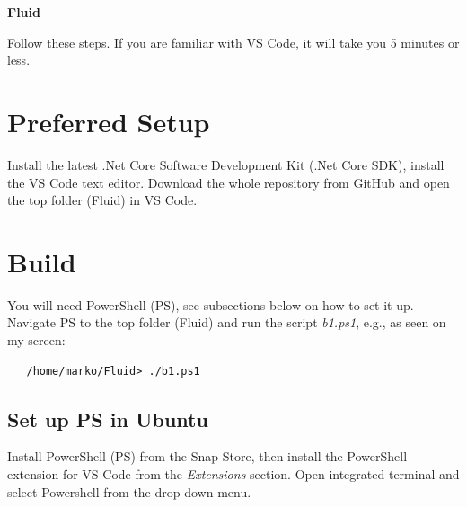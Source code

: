 

\cfoot{\thepage}								      %
\renewcommand{\headrulewidth}{0.0cm}			%
\renewcommand{\footrulewidth}{0.0cm}			%
\lstset{language=bash,basicstyle=\small\sffamily}



\begin{center}
   \textbf{\LARGE{Fluid}}\\[0.5cm]
\end{center}

Follow these steps. If you are familiar with VS Code, it will take you 5 minutes or less.

\section{Preferred Setup}
Install the latest .Net Core Software Development Kit (.Net Core SDK), install the VS Code text editor. Download the whole repository from GitHub and open the top folder (Fluid) in VS Code.

\section{Build}
You will need PowerShell (PS), see subsections below on how to set it up. Navigate PS to the top folder (Fluid) and run the script \emph{b1.ps1}, e.g., as seen on my screen:

\begin{lstlisting}
   /home/marko/Fluid> ./b1.ps1
\end{lstlisting}

\subsection{Set up PS in Ubuntu}
Install PowerShell (PS) from the Snap Store, then install the PowerShell extension for VS Code from the \emph{Extensions} section. Open integrated terminal and select Powershell from the drop-down menu.

